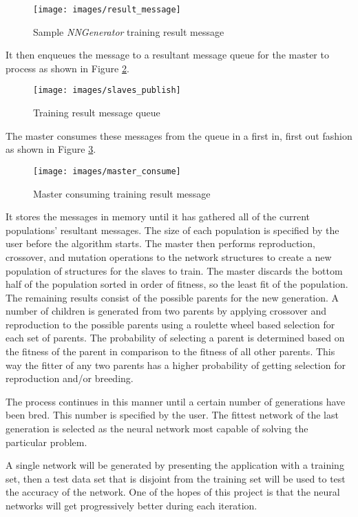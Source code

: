 \begin{figure}[h!]
  \centering
  \texttt{[image: images/result\_message]}
  \caption{Sample {\it NNGenerator} training result message}
  \label{result_message}
\end{figure}

It then enqueues the message to a resultant message queue for the master to process as shown in Figure \ref{slaves_publish}.

\begin{figure}[h!]
  \centering
  \texttt{[image: images/slaves\_publish]}
  \caption{Training result message queue}
  \label{slaves_publish}
\end{figure}

The master consumes these messages from the queue in a first in, first out fashion as shown in Figure \ref{master_consume}.

\begin{figure}[h!]
  \centering
  \texttt{[image: images/master\_consume]}
  \caption{Master consuming training result message}
  \label{master_consume}
\end{figure}

It stores the messages in memory until it has gathered all of the current populations' resultant messages. 
The size of each population is specified by the user before the algorithm starts.
The master then performs reproduction, crossover, and mutation operations to the network structures to create a new population of structures for the slaves to train.
The master discards the bottom half of the population sorted in order of fitness, so the least fit of the population. 
The remaining results consist of the possible parents for the new generation. 
A number of children is generated from two parents by applying crossover and reproduction to the possible parents using a roulette wheel based selection for each set of parents. 
The probability of selecting a parent is determined based on the fitness of the parent in comparison to the fitness of all other parents. 
This way the fitter of any two parents has a higher probability of getting selection for reproduction and/or breeding.

The process continues in this manner until a certain number of generations have been bred. 
This number is specified by the user. 
The fittest network of the last generation is selected as the neural network most capable of solving the particular problem.  

A single network will be generated by presenting the application with a training set, then a test data set that is disjoint from the training set will be used to test the accuracy of the network.
One of the hopes of this project is that the neural networks will get progressively better during each iteration. 

